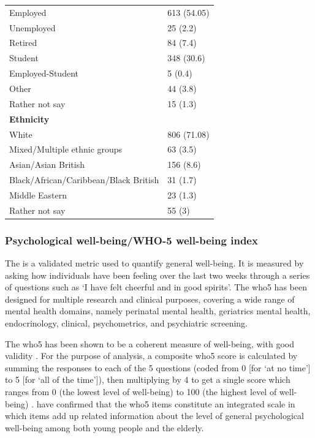 \begin{table}[!ht]
\begin{tabular}{@{}ll@{}}
    \quad Employed                              & 613 (54.05)             \\
    \quad Unemployed                            & 25  (2.2)               \\
    \quad Retired                               & 84  (7.4)               \\
    \quad Student                               & 348 (30.6)              \\
    \quad Employed-Student                      & 5   (0.4)               \\
    \quad Other                                 & 44  (3.8)               \\
    \quad Rather not say                        & 15  (1.3)               \\
    \textbf{Ethnicity}                          &                         \\
    \quad White                                 & 806 (71.08)             \\
    \quad Mixed/Multiple ethnic groups          & 63  (3.5)               \\
    \quad Asian/Asian British                   & 156 (8.6)               \\
    \quad Black/African/Caribbean/Black British & 31  (1.7)               \\
    \quad Middle Eastern                        & 23  (1.3)               \\
    \quad Rather not say                        & 55  (3)                 \\
    \bottomrule
  \end{tabular}%
\end{table}

\subsubsection*{Psychological well-being/WHO-5 well-being index}
The  is a validated metric used to quantify general well-being. It is measured by asking how individuals have been feeling over the last two weeks through a series of questions such as `I have felt cheerful and in good spirits'. The \gls{who5} has been designed for multiple research and clinical purposes, covering a wide range of mental health domains, namely perinatal mental health, geriatrics mental health, endocrinology, clinical, psychometrics, and psychiatric screening.

The \gls{who5} has been shown to be a coherent measure of well-being, with good validity \citep{Topp2015WHO}. For the purpose of analysis, a composite \gls{who5} score is calculated by summing the responses to each of the 5 questions (coded from 0 [for `at no time'] to 5 [for `all of the time']), then multiplying by 4 to get a single score which ranges from 0 (the lowest level of well-being) to 100 (the highest level of well-being) \citep{Topp2015WHO}. \citet{Blom2012Screening,LucasCarrasco2012Validity} have confirmed that the \gls{who5} items constitute an integrated scale in which items add up related information about the level of general psychological well-being among both young people and the elderly. 

